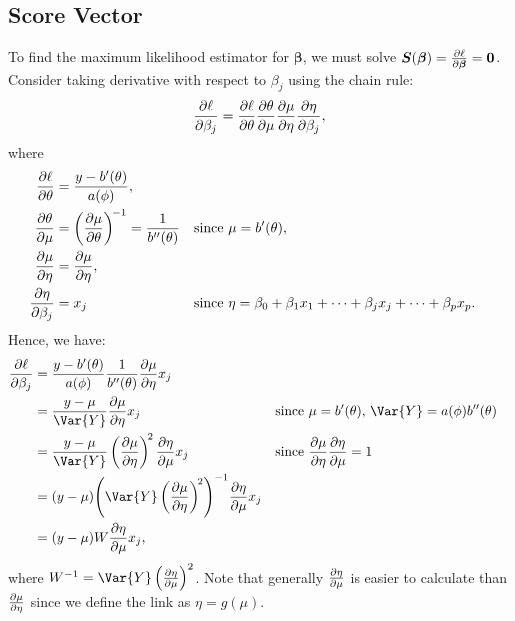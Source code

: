 \documentclass{article}\usepackage[]{graphicx}\usepackage[svgnames]{xcolor}
\providecommand{\Vector}[1]{\bm{#1}}%
\begin{document}
\subsection*{Score Vector}
To find the maximum likelihood estimator for $ \Vector{\beta} $, we must solve $ \Vector{S}(\Vector{\beta})=\pdv{\ell}{\Vector{\beta}}=\Vector{0} $.
Consider taking derivative with respect to $ \beta_j $ using the chain rule:
\[ \pdv{\ell}{\beta_j}=\pdv{\ell}{\theta}\pdv{\theta}{\mu}\pdv{\mu}{\eta}\pdv{\eta}{\beta_j}, \]
where
\begin{align*}
    \pdv{\ell}{\theta}  & =\frac{y-b^{\prime}(\theta)}{a(\phi)},                                                                                                          \\
    \pdv{\theta}{\mu}   & =\pdv{\mu}{\theta}^{\!-1}=\frac{1}{b^{\prime\prime}(\theta)} &  & \text{since $ \mu=b^\prime(\theta) $},                                        \\
    \pdv{\mu}{\eta}     & =\pdv{\mu}{\eta},                                                                                                                               \\
    \pdv{\eta}{\beta_j} & =x_j                                                         &  & \text{since $ \eta=\beta_0+\beta_1x_1+\cdots+\beta_jx_j+\cdots+\beta_px_p $}.
\end{align*}
Hence, we have:
\begin{align*}
    \pdv{\ell}{\beta_j}
     & =\frac{y-b^{\prime}(\theta)}{a(\phi)}\frac{1}{b^{\prime\prime}(\theta)}\pdv{\mu}{\eta}x_j                                                                                           \\
     & =\frac{y-\mu}{\Var{Y}}\pdv{\mu}{\eta}x_j                                                  &  & \text{since $ \mu=b^{\prime}(\theta) $, $ \Var{Y}=a(\phi)b^{\prime\prime}(\theta) $} \\
     & =\frac{y-\mu}{\Var{Y}}\pdv{\mu}{\eta}^{\!2}\pdv{\eta}{\mu}x_j                             &  & \text{since $ \pdv{\mu}{\eta}\pdv{\eta}{\mu}=1 $}                                    \\
     & =(y-\mu)\Biggl(\Var{Y}\pdv{\mu}{\eta}^{\!2}\Biggr)^{-1}\pdv{\eta}{\mu}x_j                                                                                                           \\
     & =(y-\mu)W\pdv{\eta}{\mu}x_j,
\end{align*}
where $ W^{-1}=\Var{Y}\pdv{\eta}{\mu}^2 $. Note that generally $ \pdv{\eta}{\mu} $ is easier to calculate
than $ \pdv{\mu}{\eta} $ since we define the link as $ \eta=g(\mu) $.
\end{document}
